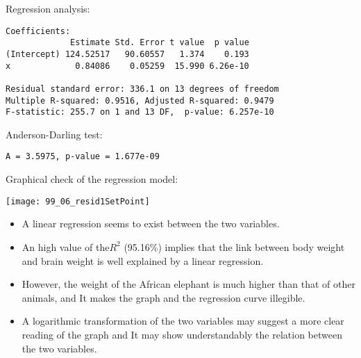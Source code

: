\begin{frame}[fragile]
  Regression analysis:\\
  \begin{small}
    \begin{verbatim}
Coefficients:
             Estimate Std. Error t value  p value    
(Intercept) 124.52517   90.60557   1.374    0.193    
x             0.84086    0.05259  15.990 6.26e-10

Residual standard error: 336.1 on 13 degrees of freedom
Multiple R-squared: 0.9516,	Adjusted R-squared: 0.9479 
F-statistic: 255.7 on 1 and 13 DF,  p-value: 6.257e-10 
    \end{verbatim}
  \end{small}
  Anderson-Darling test:\\
  \begin{small}
    \begin{verbatim}
A = 3.5975, p-value = 1.677e-09
    \end{verbatim}
  \end{small}
\end{frame}

\begin{frame}
  Graphical check of the regression model:\\
  \vspace{.1cm}
  \begin{center}
    \texttt{[image: 99\_06\_resid1SetPoint]}
    \end{center}
\end{frame}

\begin{frame}
  \vspace{0.5cm}
  \begin{itemize}
    \item A linear regression seems to exist between the two variables.
    \vspace{0.35cm}
    \item An high value of the$ R^2 $ (95.16\%) implies that the link between body weight and brain weight is well explained by a linear regression.
    \vspace{0.35cm}
    \item However, the weight of the African elephant is much higher than that of other animals, and It makes the graph and the regression curve illegible.
    \vspace{0.35cm}
    \item A logarithmic transformation of the two variables may suggest a more clear reading of the graph and It may show understandably the relation between the two variables.
  \end{itemize}
\end{frame}

